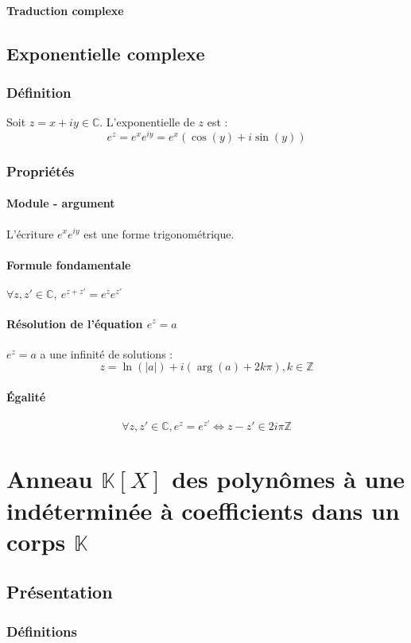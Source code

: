 \documentclass[12pt,a4paper,french]{book}
\begin{document}
			\subsubsection{Traduction complexe}
	\section{Exponentielle complexe}
		\subsection{Définition}
		Soit $z = x+iy \in \mathbb{C}.$ L'exponentielle de $z$ est :
		\[e^{z} = e^{x}e^{iy} = e^{x}(\cos(y)+i\sin(y))\] 
		\subsection{Propriétés}
			\subsubsection{Module - argument}
			L'écriture $e^{x}e^{iy}$ est une forme trigonométrique.
			\subsubsection{Formule fondamentale}
			$\forall z,z' \in \mathbb{C}, \ e^{z+z'} = e^{z}e^{z'}$
			\subsubsection{Résolution de l'équation $e^{z} = a$}
			$e^{z} = a$ a une infinité de solutions : \[z = \ln(\left|a\right|) + i(\arg(a)+2k\pi), k\in \mathbb{Z} \]
			\subsubsection{Égalité}
			\[\forall z,z' \in \mathbb{C}, e^{z} = e^{z'} \Leftrightarrow z-z' \in 2i\pi\mathbb{Z}\]
			
		
\chapter{Anneau $\mathbb{K}[X]$ des polynômes à une indéterminée à coefficients dans un corps $\mathbb{K}$}
	\section{Présentation}
		\subsection{Définitions}
\end{document}
